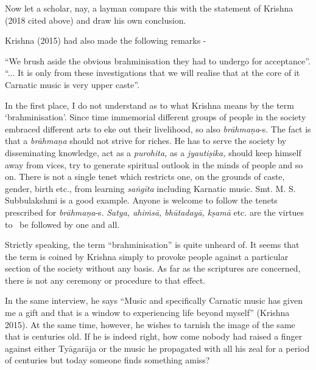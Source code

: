 Now let a scholar, nay, a layman compare this with the statement of Krishna (2018 cited above) and draw his own conclusion.

Krishna (2015) had also made the following remarks -  

\begin{myquote}
“We brush aside the obvious brahminisation they had to undergo for acceptance”. “... It is only from these investigations that we will realise that at the core of it Carnatic music is very upper caste”.
\end{myquote}

In the first place, I do not understand as to what Krishna means by the term ‘brahminisation’. Since time immemorial different groups of people in the society embraced different arts to eke out their livelihood, so also \textit{brāhmaṇa}-s. The fact is that a \textit{brāhmaṇa} should not strive for riches. He has to serve the society by disseminating knowledge, act as a \textit{purohita,} as a \textit{jyautiṣika,} should keep himself away from vices, try to generate spiritual outlook in the minds of people and so on. There is not a single tenet which restricts one, on the grounds of caste, gender, birth etc., from learning \textit{saṅgīta} including Karnatic music. Smt. M. S. Subbulakshmi is a good example. Anyone is welcome to follow the tenets prescribed for \textit{brāhmaṇa}-s. \textit{Satya, ahiṁsā, bhūtadayā, kṣamā} etc. are the virtues to  be followed by one and all. 

Strictly speaking, the term “brahminisation” is quite unheard of. It seems that the term is coined by Krishna simply to provoke people against a particular section of the society without any basis. As far as the scriptures are concerned, there is not any ceremony or procedure to that effect.

\newpage

In the same interview, he says “Music and specifically Carnatic music has given me a gift and that is a window to experiencing life beyond myself” (Krishna 2015). At the same time, however, he wishes to tarnish the image of the same that is centuries old. If he is indeed right, how come nobody had raised a finger against either Tyāgarāja or the music he propagated with all his zeal for a period of centuries but today someone finds something amiss? 


